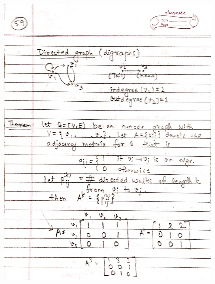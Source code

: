 \begin{figure}[H]
    \centering
    \includegraphics[scale=0.25]{"./MIT 6.042J/MIT_6042J_059"}
\end{figure}
\newpage
